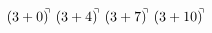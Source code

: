 \documentclass[preview]{standalone}
\begin{document}
\begin{align*}
(3+0)^{\hspace{-0.1cm}\urcorner} \ (3+4)^{\hspace{-0.1cm}\urcorner} \ (3+7)^{\hspace{-0.1cm}\urcorner} \ (3+10)^{\hspace{-0.1cm}\urcorner}
\end{align*}
\end{document}

